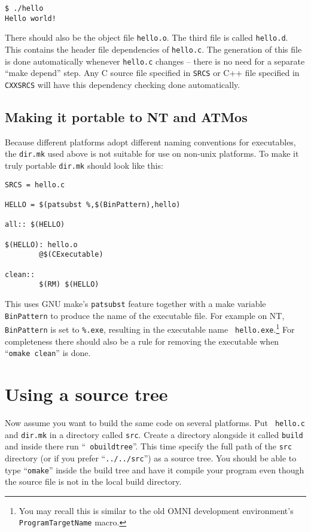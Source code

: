 \documentclass[11pt,twoside,onecolumn]{article}
\begin{document}
{\footnotesize \begin{verbatim}
$ ./hello
Hello world!
\end{verbatim}}

There should also be the object file {\tt hello.o}.  The third file is called
{\tt hello.d}.  This contains the header file dependencies of {\tt hello.c}.
The generation of this file is done automatically whenever {\tt hello.c}
changes -- there is no need for a separate ``make depend'' step.  Any C source
file specified in {\tt SRCS} or C++ file specified in {\tt CXXSRCS} will have
this dependency checking done automatically.

\subsection{Making it portable to NT and ATMos}

Because different platforms adopt different naming conventions for executables,
the {\tt dir.mk} used above is not suitable for use on non-unix platforms.  To
make it truly portable {\tt dir.mk} should look like this:

{\footnotesize \begin{verbatim}
SRCS = hello.c

HELLO = $(patsubst %,$(BinPattern),hello)

all:: $(HELLO)

$(HELLO): hello.o
        @$(CExecutable)

clean::
        $(RM) $(HELLO)
\end{verbatim}}

This uses GNU make's {\tt patsubst} feature together with a make variable {\tt
BinPattern} to produce the name of the executable file.  For example on NT,
{\tt BinPattern} is set to {\tt \%.exe}, resulting in the executable name {\tt
hello.exe}.\footnote{You may recall this is similar to the old OMNI development
environment's {\tt ProgramTargetName} macro.}  For completeness there should
also be a rule for removing the executable when ``{\tt omake clean}'' is done.

\section{Using a source tree}

Now assume you want to build the same code on several platforms.  Put {\tt
hello.c} and {\tt dir.mk} in a directory called {\tt src}.  Create a
directory alongside it called {\tt build} and inside there run ``{\tt
obuildtree}''.  This time specify the full path of the {\tt src} directory (or
if you prefer ``{\tt ../../src}'') as a source tree.  You should be able to
type ``{\tt omake}'' inside the build tree and have it compile your program
even though the source file is not in the local build directory.
\end{document}

